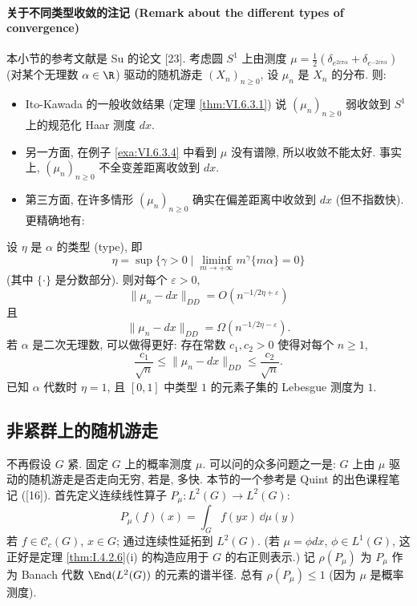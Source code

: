 \paragraph{关于不同类型收敛的注记 (Remark about the different types of convergence)}
本小节的参考文献是 Su 的论文 {[}23{]}.
考虑圆 $S^1$ 上由测度 $\mu = \frac{1}{2}(\delta_{e^{2i\pi\alpha}} + \delta_{e^{-2i\pi\alpha}})$ (对某个无理数 $\alpha \in \R$) 驱动的随机游走 $(X_n)_{n \geq 0}$, 设 $\mu_n$ 是 $X_n$ 的分布. 则:
\begin{itemize}
\item Ito-Kawada 的一般收敛结果 (定理 \ref{thm:VI.6.3.1}) 说 $(\mu_n)_{n \geq 0}$ 弱收敛到 $S^1$ 上的规范化 Haar 测度 $dx$.
\item 另一方面, 在例子 \ref{exa:VI.6.3.4} 中看到 $\mu$ 没有谱隙, 所以收敛不能太好. 事实上, $(\mu_n)_{n \geq 0}$ 不全变差距离收敛到 $dx$.
\item 第三方面, 在许多情形 $(\mu_n)_{n \geq 0}$ 确实在偏差距离中收敛到 $dx$ (但不指数快). 更精确地有:
\end{itemize}

\begin{theorem}[无理旋转的偏差]
\label{thm:VI.6.4.3}
设 $\eta$ 是 $\alpha$ 的类型 (type), 即
\[
\eta = \sup\{\gamma > 0 \mid \liminf_{m \to +\infty}m^{\gamma}\{m\alpha\} = 0\}
\]
(其中 $\{\cdot\}$ 是分数部分). 则对每个 $\varepsilon > 0$,
\[
\|\mu_n - dx\|_{DD} = O(n^{-1/2\eta + \varepsilon})
\]
且
\[
\|\mu_n - dx\|_{DD} = \Omega(n^{-1/2\eta - \varepsilon}).
\]
若 $\alpha$ 是二次无理数, 可以做得更好: 存在常数 $c_1, c_2 > 0$ 使得对每个 $n \geq 1$,
\[
\frac{c_1}{\sqrt{n}} \leq \|\mu_n - dx\|_{DD} \leq \frac{c_2}{\sqrt{n}}.
\]
已知 $\alpha$ 代数时 $\eta = 1$, 且 $[0,1]$ 中类型 $1$ 的元素子集的 Lebesgue 测度为 $1$.
\end{theorem}

\subsection{非紧群上的随机游走}
不再假设 $G$ 紧. 固定 $G$ 上的概率测度 $\mu$. 可以问的众多问题之一是: $G$ 上由 $\mu$ 驱动的随机游走是否走向无穷, 若是, 多快.
本节的一个参考是 Quint 的出色课程笔记 ({[}16{]}).
首先定义连续线性算子 $P_{\mu} \colon L^2(G) \to L^2(G)$:
\[
P_{\mu}(f)(x) = \int_G f(yx)\,\dd\mu(y)
\]
若 $f \in \mathcal{C}_c(G)$, $x \in G$; 通过连续性延拓到 $L^2(G)$. (若 $\mu = \phi dx$, $\phi \in L^1(G)$, 这正好是定理 \ref{thm:I.4.2.6}(i) 的构造应用于 $G$ 的右正则表示.)
记 $\rho(P_{\mu})$ 为 $P_{\mu}$ 作为 Banach 代数 $\End(L^2(G))$ 的元素的谱半径. 总有 $\rho(P_{\mu}) \leq 1$ (因为 $\mu$ 是概率测度).

